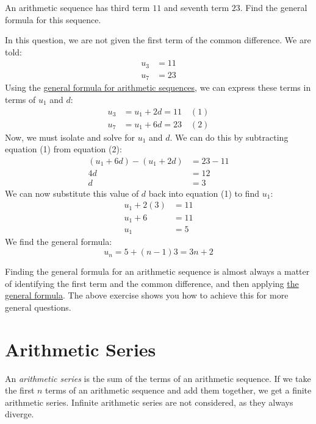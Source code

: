 \begin{exercise}
	An arithmetic sequence has third term $11$ and seventh term $23$. Find the general formula for this sequence.
\end{exercise}
\begin{answer}
	In this question, we are not given the first term of the common difference. We are told:
	\begin{align*}
		u_3 &= 11 \\
		u_7 &= 23
	\end{align*}
	Using the \hyperref[prop:arithmetic-general-formula]{general formula for arithmetic sequences}, we can express these terms in terms of $u_1$ and $d$:
	\begin{align*}
		u_3 &= u_1 + 2d = 11 \quad (1)\\
		u_7 &= u_1 + 6d = 23 \quad (2)
	\end{align*}
	Now, we must isolate and solve for $u_1$ and $d$. We can do this by subtracting equation (1) from equation (2):
	\begin{align*}
		(u_1 + 6d) - (u_1 + 2d) &= 23 - 11 \\
		4d &= 12 \\
		d &= 3
	\end{align*}
	We can now substitute this value of $d$ back into equation (1) to find $u_1$:
	\begin{align*}
		u_1 + 2(3) &= 11 \\
		u_1 + 6 &= 11 \\
		u_1 &= 5
	\end{align*}
	We find the general formula:
	\begin{equation*}
		u_n = 5 + (n-1)3 = 3n + 2
	\end{equation*}
\end{answer}

Finding the general formula for an arithmetic sequence is almost always a matter of
identifying the first term and the common difference, and then applying
\hyperref[prop:arithmetic-general-formula]{the general formula}. The above exercise shows you how 
to achieve this for more general questions.

\section{Arithmetic Series}

\begin{definition}\label{def:arithmetic_series}
	An \textit{arithmetic series} is the sum of the terms of an arithmetic sequence. If we take the first $n$ terms of an arithmetic sequence
	and add them together, we get a finite arithmetic series. Infinite arithmetic series are not considered, as they always diverge.
\end{definition}

